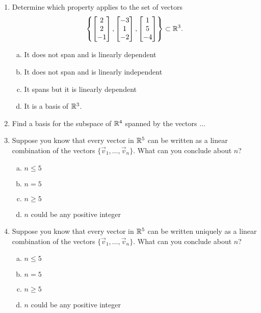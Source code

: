 \documentclass{article}
\begin{document}
\begin{enumerate}[1)]
\item Determine which property applies to the set of vectors $$\left\{ \begin{bmatrix}  2 \\ 2 \\ -1 \end{bmatrix}, \begin{bmatrix} -3 \\ 1 \\ -2 \end{bmatrix} , \begin{bmatrix} 1 \\ 5 \\ -4 \end{bmatrix}\right\}\subset \mathbb{R}^3.$$
\begin{enumerate}[(a)]
\item It does not span and is linearly dependent
\item It does not span and is linearly independent
\item It spans but it is linearly dependent
\item It is a basis of $\mathbb{R}^3$.
\end{enumerate}

\item Find a basis for the subspace of $\mathbb{R}^4$ spanned by the vectors ...

\item Suppose you know that every vector in $\mathbb{R}^5$ can be written as a linear combination of the vectors $\{\vec{v}_1, \ldots, \vec{v}_n\}$.  What can you conclude about $n$?
\begin{enumerate}[(a)]
\item $n \leq 5$
\item $n=5$
\item $n \geq 5$
\item $n$ could be any positive integer
\end{enumerate}

\item Suppose you know that every vector in $\mathbb{R}^5$ can be written uniquely as a linear combination of the vectors $\{\vec{v}_1, \ldots, \vec{v}_n\}$.  What can you conclude about $n$?
\begin{enumerate}[(a)]
\item $n \leq 5$
\item $n=5$
\item $n \geq 5$
\item $n$ could be any positive integer
\end{enumerate}


\end{enumerate}
\end{document}
